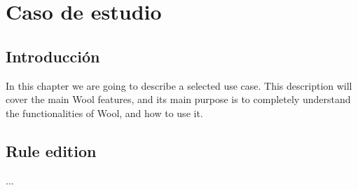 \chapter{Caso de estudio}
\label{chap:case-study}

\section{Introducción}
\label{sec:introduction}
In this chapter we are going to describe a selected use case. This description will cover the main Wool features, and its main purpose is to completely understand the functionalities of Wool, and how to use it. 
\section{Rule edition}
...